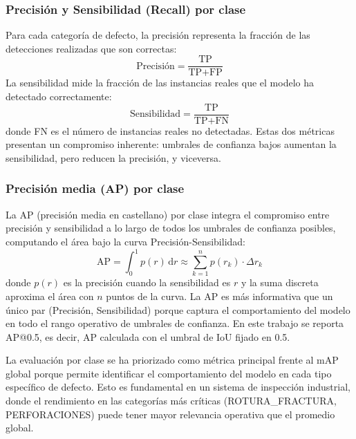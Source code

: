 \subsubsection{Precisión y Sensibilidad (Recall) por clase}

Para cada categoría de defecto, la precisión representa la fracción de las detecciones realizadas que son correctas:
\begin{equation}
\text{Precisión} = \frac{\text{TP}}{\text{TP} + \text{FP}}
\label{eq:precision}
\end{equation}
La sensibilidad mide la fracción de las instancias reales que el modelo ha detectado correctamente:
\begin{equation}
\text{Sensibilidad} = \frac{\text{TP}}{\text{TP} + \text{FN}}
\label{eq:recall}
\end{equation}
donde \acrshort{FN} es el número de instancias reales no detectadas. Estas dos métricas presentan un compromiso inherente: umbrales de confianza bajos aumentan la sensibilidad, pero reducen la precisión, y viceversa.

\subsubsection{Precisión media (AP) por clase}

La \acrfull{AP} (precisión media en castellano) por clase integra el compromiso entre precisión y sensibilidad a lo largo de todos los umbrales de confianza posibles, computando el área bajo la curva Precisión-Sensibilidad:
\begin{equation}
\text{AP} = \int_0^1 p(r)\, \mathrm{d}r \approx \sum_{k=1}^{n} p(r_k) \cdot \Delta r_k
\label{eq:ap}
\end{equation}
donde $p(r)$ es la precisión cuando la sensibilidad es $r$ y la suma discreta aproxima el área con $n$ puntos de la curva. La AP es más informativa que un único par (Precisión, Sensibilidad) porque captura el comportamiento del modelo en todo el rango operativo de umbrales de confianza. En este trabajo se reporta AP@0.5, es decir, AP calculada con el umbral de IoU fijado en 0.5.

La evaluación por clase se ha priorizado como métrica principal frente al mAP global porque permite identificar el comportamiento del modelo en cada tipo específico de defecto. Esto es fundamental en un sistema de inspección industrial, donde el rendimiento en las categorías más críticas (\mbox{ROTURA\_FRACTURA}, PERFORACIONES) puede tener mayor relevancia operativa que el promedio global.

